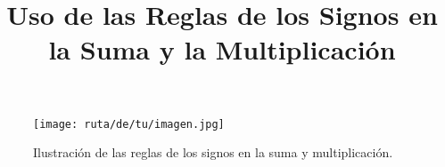 \usepackage{graphicx}



\title{Uso de las Reglas de los Signos en la Suma y la Multiplicación}
\author{}
\date{}
\maketitle

\begin{figure}[h]
    \centering
    \texttt{[image: ruta/de/tu/imagen.jpg]}
    \caption{Ilustración de las reglas de los signos en la suma y multiplicación.}
    \label{fig:reglas-signos}
\end{figure}


